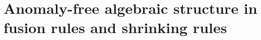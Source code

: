 \documentclass[11pt,nofootinbib,preprint]{revtex4-1}
\begin{document}

\section{Anomaly-free algebraic structure in fusion rules and shrinking rules}\label{section_algebraic}
\end{document}

